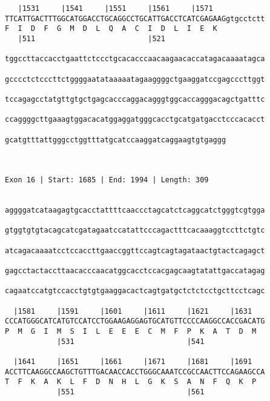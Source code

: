 \documentclass{article}
\begin{document}
\begin{Verbatim}
   |1531     |1541     |1551     |1561     |1571            
TTCATTGACTTTGGCATGGACCTGCAGGCCTGCATTGACCTCATCGAGAAGgtgcctctt
F  I  D  F  G  M  D  L  Q  A  C  I  D  L  I  E  K           
   |511                          |521                       
  
tggccttaccacctgaattctccctgcacacccaacaagaacaccatagacaaaatagca
                                                            
gcccctctcccttctggggaatataaaaatagaaggggctgaaggatccgagcccttggt
                                                            
tccagagcctatgttgtgctgagcacccaggacagggtggcaccagggacagctgatttc
                                                            
ccaggggcttgaaagtggacacatggaggatgggcacctgcatgatgacctcccacacct
                                                            
gcatgtttattgggcctggtttatgcatccaaggatcaggaagtgtgaggg
                                                   
                                                   
 
Exon 16 | Start: 1685 | End: 1994 | Length: 309


aggggatcataagagtgcacctattttcaaccctagcatctcaggcatctgggtcgtgga
                                                            
gtggtgtgtacagcatcgatagaatccatattcccagactttcacaaaggtccttctgtc
                                                            
atcagacaaaatcctccaccttgaaccggttccagtcagtagataactgtactcagagct
                                                            
gagcctactaccttaacacccaacatggcacctccacgagcaagtatattgaccatagag
                                                            
cagaatccatgtccacctgtgtgaaggacactcagtgatgctctctcctgcttcctcagc
                                                            
  |1581     |1591     |1601     |1611     |1621     |1631   
CCCATGGGCATCATGTCCATCCTGGAAGAGGAGTGCATGTTCCCCAAGGCCACCGACATG
P  M  G  I  M  S  I  L  E  E  E  C  M  F  P  K  A  T  D  M  
            |531                          |541              
  
  |1641     |1651     |1661     |1671     |1681     |1691   
ACCTTCAAGGCCAAGCTGTTTGACAACCACCTGGGCAAATCCGCCAACTTCCAGAAGCCA
T  F  K  A  K  L  F  D  N  H  L  G  K  S  A  N  F  Q  K  P  
            |551                          |561              
  

\end{Verbatim}
\end{document}
